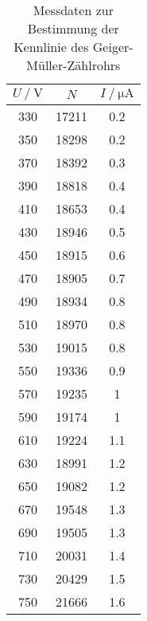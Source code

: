 \begin{table}
    \centering
    \caption{Messdaten zur Bestimmung der Kennlinie des Geiger-Müller-Zählrohrs}
    \label{tab:kennlinie}
\begin{tabular}{c c c}
    \toprule
    $U \mathbin{/} \mathrm{V}$ & $N$ &  $I \mathbin{/} \unit{\micro\ampere}$ \\
    \midrule
         330 &    17211 &   0.2 \\
         350 &    18298 &   0.2 \\
         370 &    18392 &   0.3 \\
         390 &    18818 &   0.4 \\
         410 &    18653 &   0.4 \\
         430 &    18946 &   0.5 \\
         450 &    18915 &   0.6 \\
         470 &    18905 &   0.7 \\
         490 &    18934 &   0.8 \\
         510 &    18970 &   0.8 \\
         530 &    19015 &   0.8 \\
         550 &    19336 &   0.9 \\
         570 &    19235 &     1 \\
         590 &    19174 &     1 \\
         610 &    19224 &   1.1 \\
         630 &    18991 &   1.2 \\
         650 &    19082 &   1.2 \\
         670 &    19548 &   1.3 \\
         690 &    19505 &   1.3 \\
         710 &    20031 &   1.4 \\
         730 &    20429 &   1.5 \\
         750 &    21666 &   1.6 \\
    \bottomrule
    \end{tabular}
\end{table}